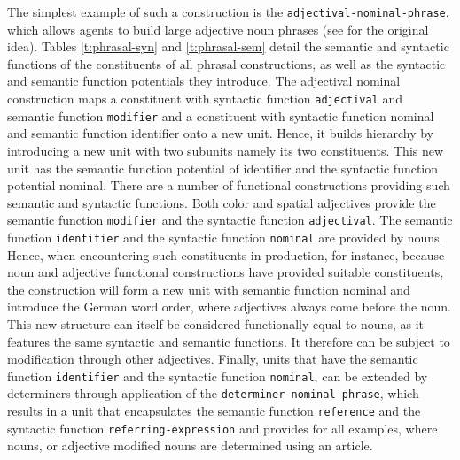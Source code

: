 The simplest example of such a construction is the {\footnotesize\tt adjectival-nominal-phrase}, which allows agents to build large adjective noun phrases 
(see \citealp{steels2011phrasal} for the original idea). 
Tables \ref{t:phrasal-syn} 
and \ref{t:phrasal-sem} detail the semantic and syntactic functions of 
the constituents of all phrasal constructions, as well as the syntactic 
and semantic function potentials they introduce. The adjectival 
nominal construction maps a constituent with syntactic 
function {\footnotesize\tt adjectival} and semantic function {\footnotesize\tt modifier} and a constituent with syntactic function nominal and semantic function identifier onto a new unit. Hence, it builds hierarchy by introducing a new unit with two subunits 
namely its two constituents. This new unit has the semantic function potential of identifier and the syntactic function 
potential nominal. There are a number of functional constructions providing such semantic and syntactic 
functions. Both color and spatial adjectives provide the semantic function {\footnotesize\tt modifier} and the syntactic
function {\footnotesize\tt adjectival}. The semantic function {\footnotesize\tt identifier} and the syntactic function {\footnotesize\tt nominal} are provided by nouns. Hence, when encountering such constituents in production, for instance, because noun and adjective functional constructions have provided suitable constituents, the construction will form a new unit with semantic function 
nominal and introduce the German word order, where adjectives always come before the 
noun. This new structure can itself be considered functionally equal to nouns, as it features the same syntactic and 
semantic functions. It therefore can be subject to modification through other adjectives. Finally, units that have the
semantic function {\footnotesize\tt identifier} and the syntactic function {\footnotesize\tt nominal},
can be extended by determiners through application of the {\footnotesize\tt determiner-nominal-phrase}, which results in a unit that encapsulates the semantic function 
{\footnotesize\tt reference} and the syntactic function {\footnotesize\tt referring-expression} and
provides for all examples, where nouns, or adjective modified nouns are determined
using an article.
